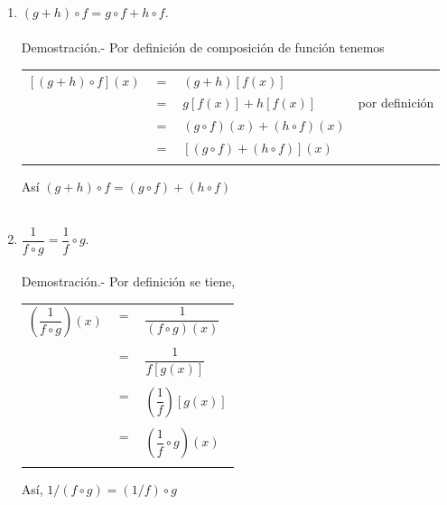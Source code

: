 \begin{enumerate}
\begin{enumerate}[\bfseries (a)]
		\item $(g+h) \circ f = g\circ f + h \circ f.$\\\\
		    Demostración.-\; Por definición de composición de función tenemos 
		    \begin{center}
			\begin{tabular}{rcll}
			    $\left[ \left( g+ h\right) \circ f \right] \left(x\right)$ & $=$ & $\left(g+h\right)\left[f(x)\right]$ & \\ 
			    & $=$ & $g\left[ f(x)\right] + h\left[f(x)\right]$ & por definición\\
			    & $=$ & $\left(g\circ f\right)(x) + \left(h \circ f\right)(x)$ & \\
			    & $=$ & $\left[ \left(g\circ f\right)  + \left(h \circ f\right)\right](x)$ &\\\\
			\end{tabular} 
		    \end{center}
		    Así  $(g+h)\circ f = (g\circ f)+(h \circ f)$\\\\

		\item $\dfrac{1}{f\circ g} = \dfrac{1}{f} \circ g.$\\\\
		    Demostración.-\; Por definición se tiene,
		    \begin{center}
			\begin{tabular}{rcl}
			    $\left( \dfrac{1}{f\circ g}\right)(x)$ & $=$ & $\dfrac{1}{(f\circ g)(x)}$\\\\
			    & $=$ & $\dfrac{1}{f\left[ g(x)\right] }$\\\\
			    & $=$ & $\left( \dfrac{1}{f}\right) \left[ g(x)\right]$\\\\
			    & $=$ & $\left( \dfrac{1}{f} \circ g\right)(x)$\\\\
			\end{tabular}
		    \end{center}
		    Así, $1/(f\circ g)=(1/f)\circ g$\\\\


\end{enumerate}
\end{enumerate}

